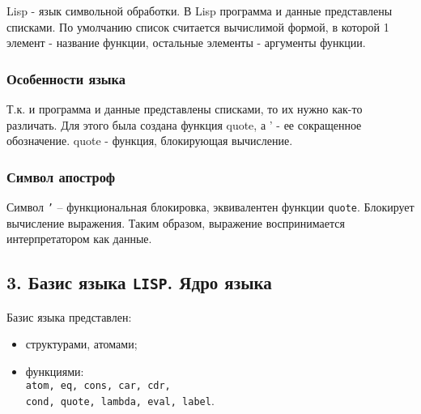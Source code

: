 Lisp - язык символьной обработки. 
В Lisp программа и данные представлены списками.
По умолчанию список считается вычислимой формой, в которой 1 элемент - название функции, остальные элементы - аргументы функции.

\subsubsection*{Особенности языка}

Т.к. и программа и данные представлены списками, то их нужно как-то различать. 
Для этого была создана функция quote, а ' - ее сокращенное обозначение. 
quote - функция, блокирующая вычисление.

\subsubsection*{Символ апостроф}

Символ {\texttt{'}} -- функциональная блокировка, эквивалентен функции {\texttt{quote}}. Блокирует вычисление выражения. Таким образом, выражение воспринимается интерпретатором как данные.

\subsection*{3. Базис языка \texttt{LISP}. Ядро языка}

Базис языка представлен:

\begin{itemize}[topsep=0pt, noitemsep]
	\item структурами, атомами;

	\item функциями:\\

	{\texttt{atom, eq, cons, car, cdr,}}\\

	{\texttt{cond, quote, lambda, eval, label}}.

\end{itemize}